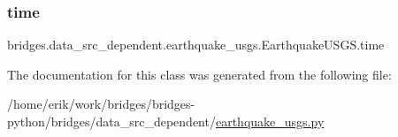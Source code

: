 \subsubsection{\texorpdfstring{time}{time}}
{\footnotesize\ttfamily bridges.\+data\+\_\+src\+\_\+dependent.\+earthquake\+\_\+usgs.\+Earthquake\+U\+S\+G\+S.\+time}



The documentation for this class was generated from the following file\+:\begin{DoxyCompactItemize}
\item 
/home/erik/work/bridges/bridges-\/python/bridges/data\+\_\+src\+\_\+dependent/\hyperlink{earthquake__usgs_8py}{earthquake\+\_\+usgs.\+py}\end{DoxyCompactItemize}
